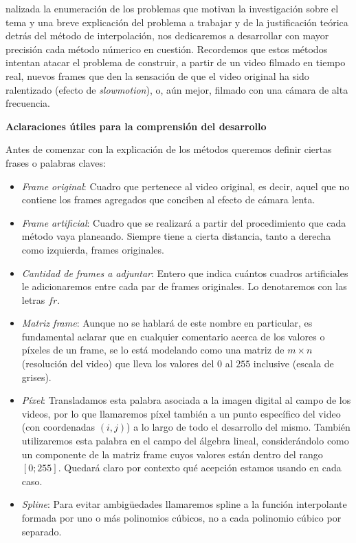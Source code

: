 
nalizada la enumeraci\'on de los problemas que motivan la investigaci\'on sobre el tema y una breve explicaci\'on del problema a trabajar y de la justificación teórica detrás del método de interpolación, nos dedicaremos a desarrollar con mayor precisi\'on cada m\'etodo n\'umerico en cuesti\'on. Recordemos que estos métodos intentan atacar el problema de construir, a partir de un video filmado en tiempo real, nuevos frames que den la sensaci\'on de que el video original ha sido ralentizado (efecto de \emph{slowmotion}), o, aún mejor, filmado con una cámara de alta frecuencia.

\textbf{Aclaraciones \'utiles para la comprensi\'on del desarrollo}

Antes de comenzar con la explicaci\'on de los m\'etodos queremos definir ciertas frases o palabras claves:

\begin{itemize}
	\item \textit{Frame original}: Cuadro que pertenece al video original, es decir, aquel que no contiene los frames agregados que conciben al efecto de c\'amara lenta.
	\item \textit{Frame artificial}: Cuadro que se realizar\'a a partir del procedimiento que cada m\'etodo vaya planeando. Siempre tiene a cierta distancia, tanto a derecha como izquierda, frames originales.
	\item \textit{Cantidad de frames a adjuntar}: Entero que indica cu\'antos cuadros artificiales le adicionaremos entre cada par de frames originales. Lo denotaremos con las letras $fr$.
	\item \textit{Matriz frame}: Aunque no se hablar\'a de este nombre en particular, es fundamental aclarar que en cualquier comentario acerca de los valores o p\'ixeles de un frame, se lo est\'a modelando como una matriz de $m \times n$ (resoluci\'on del video) que lleva los valores del $0$ al $255$ inclusive (escala de grises).
    \item \textit{P\'ixel}: Transladamos esta palabra asociada a la imagen digital al campo de los videos, por lo que llamaremos píxel también a un punto específico del video (con coordenadas $(i,j)$) a lo largo de todo el desarrollo del mismo. También utilizaremos esta palabra en el campo del \'algebra lineal, considerándolo como un componente de la matriz frame cuyos valores están dentro del rango $[0;255]$. Quedará claro por contexto qué acepción estamos usando en cada caso.
    \item \textit{Spline}: Para evitar ambigüedades llamaremos spline a la función interpolante formada por uno o más polinomios cúbicos, no a cada polinomio cúbico por separado.
\end{itemize}

